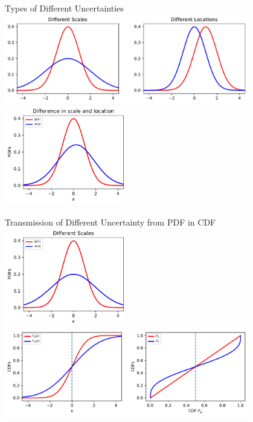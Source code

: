 \begin{frame}{Types of Different Uncertainties}
\centering
	\includegraphics[width=0.8\textwidth]{img/2GaussianPDFs2Scales2Locations.pdf}
	\includegraphics[width=0.4\textwidth]{img/mapping_pdfs_diff_scale_loc.pdf}
\end{frame}

\begin{frame}{Transmission of Different Uncertainty from PDF in CDF
 \hyperlink{diffShapes}{} }
\centering
	\includegraphics[width=0.4\textwidth]{img/2GaussianPDFs2Scales.pdf}
	\includegraphics[width=0.8\textwidth]{img/mapping_cdfs_noarrows.pdf}
\end{frame}

